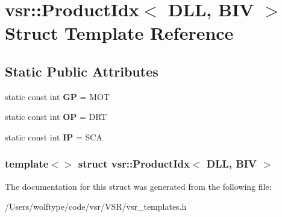 \hypertarget{structvsr_1_1_product_idx_3_01_d_l_l_00_01_b_i_v_01_4}{\section{vsr\-:\-:Product\-Idx$<$ D\-L\-L, B\-I\-V $>$ Struct Template Reference}
\label{structvsr_1_1_product_idx_3_01_d_l_l_00_01_b_i_v_01_4}
}
\subsection*{Static Public Attributes}
\begin{DoxyCompactItemize}
\item 
\hypertarget{structvsr_1_1_product_idx_3_01_d_l_l_00_01_b_i_v_01_4_ac2e4cccf3c1266488d5074c272f67afb}{static const int {\bfseries G\-P} = M\-O\-T}\label{structvsr_1_1_product_idx_3_01_d_l_l_00_01_b_i_v_01_4_ac2e4cccf3c1266488d5074c272f67afb}

\item 
\hypertarget{structvsr_1_1_product_idx_3_01_d_l_l_00_01_b_i_v_01_4_ae52e19b580eb7b12dceed0ce0d71dc8f}{static const int {\bfseries O\-P} = D\-R\-T}\label{structvsr_1_1_product_idx_3_01_d_l_l_00_01_b_i_v_01_4_ae52e19b580eb7b12dceed0ce0d71dc8f}

\item 
\hypertarget{structvsr_1_1_product_idx_3_01_d_l_l_00_01_b_i_v_01_4_a87c4b66fd1dbce3e76fb9a77e5981827}{static const int {\bfseries I\-P} = S\-C\-A}\label{structvsr_1_1_product_idx_3_01_d_l_l_00_01_b_i_v_01_4_a87c4b66fd1dbce3e76fb9a77e5981827}

\end{DoxyCompactItemize}
\subsubsection*{template$<$$>$ struct vsr\-::\-Product\-Idx$<$ D\-L\-L, B\-I\-V $>$}



The documentation for this struct was generated from the following file\-:\begin{DoxyCompactItemize}
\item 
/\-Users/wolftype/code/vsr/\-V\-S\-R/vsr\-\_\-templates.\-h\end{DoxyCompactItemize}

